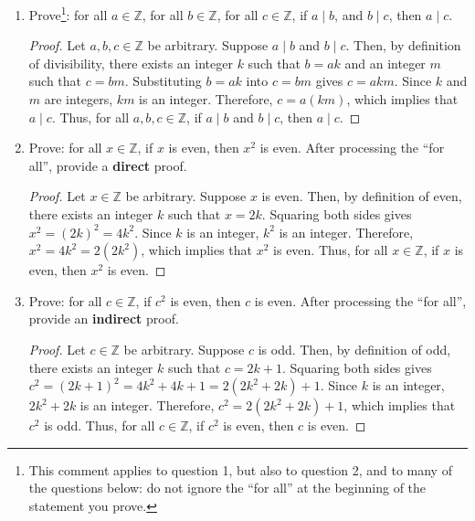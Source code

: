 \documentclass{article}
\begin{document}
\begin{enumerate}
            \newpage

      \item Prove\footnote{This comment applies to question 1, but also to question 2, and
                  to many of the questions below: do not ignore the ``for all'' at the beginning
                  of the statement you prove.}: for all $a \in \mathbb{Z}$, for all $b \in
                  \mathbb{Z}$, for all $c \in \mathbb{Z}$, if $a \mid b$, and $b \mid c$, then $a
                  \mid c$.

            \begin{proof}
                  Let $a, b, c \in \mathbb{Z}$ be arbitrary. Suppose $a \mid b$ and $b \mid c$. Then, by definition of divisibility, there exists an integer $k$ such that $b = ak$ and an integer $m$ such that $c = bm$. Substituting $b = ak$ into $c = bm$ gives $c = akm$. Since $k$ and $m$ are integers, $km$ is an integer. Therefore, $c = a(km)$, which implies that $a \mid c$. Thus, for all $a, b, c \in \mathbb{Z}$, if $a \mid b$ and $b \mid c$, then $a \mid c$.
            \end{proof}

            \newpage

      \item Prove: for all $x \in \mathbb{Z}$, if $x$ is even, then $x^2$ is even. After
            processing the ``for all'', provide a {\bf direct} proof.

            \begin{proof}
                  Let $x \in \mathbb{Z}$ be arbitrary. Suppose $x$ is even. Then, by definition of even, there exists an integer $k$ such that $x = 2k$. Squaring both sides gives $x^2 = {(2k)}^2 = 4k^2$. Since $k$ is an integer, $k^2$ is an integer. Therefore, $x^2 = 4k^2 = 2(2k^2)$, which implies that $x^2$ is even. Thus, for all $x \in \mathbb{Z}$, if $x$ is even, then $x^2$ is even.
            \end{proof}

            \newpage

      \item Prove: for all $c \in \mathbb{Z}$, if $c^2$ is even, then $c$ is even. After
            processing the ``for all'', provide an {\bf indirect} proof.

            \begin{proof}
                  Let $c \in \mathbb{Z}$ be arbitrary. Suppose $c$ is odd. Then, by definition of odd, there exists an integer $k$ such that $c = 2k + 1$. Squaring both sides gives $c^2 = {(2k + 1)}^2 = 4k^2 + 4k + 1 = 2(2k^2 + 2k) + 1$. Since $k$ is an integer, $2k^2 + 2k$ is an integer. Therefore, $c^2 = 2(2k^2 + 2k) + 1$, which implies that $c^2$ is odd. Thus, for all $c \in \mathbb{Z}$, if $c^2$ is even, then $c$ is even.
            \end{proof}


\end{enumerate}
\end{document}

